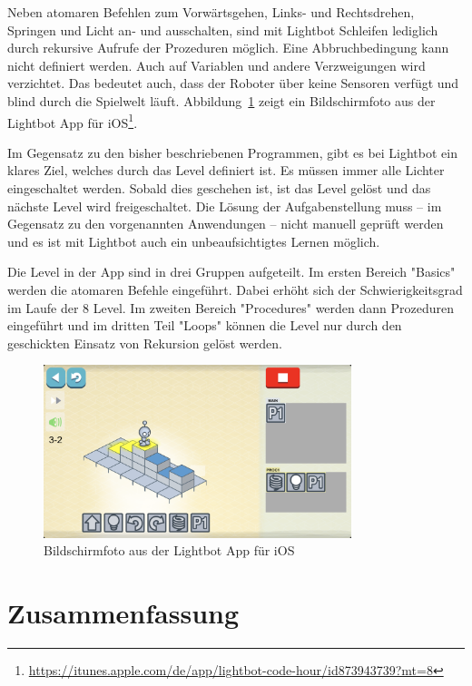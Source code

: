 Neben atomaren Befehlen zum Vorwärtsgehen, Links- und Rechtsdrehen, Springen und Licht an- und ausschalten, sind mit Lightbot Schleifen lediglich durch rekursive Aufrufe der Prozeduren möglich. Eine Abbruchbedingung kann nicht definiert werden. Auch auf Variablen und andere Verzweigungen wird verzichtet. Das bedeutet auch, dass der Roboter über keine Sensoren verfügt und blind durch die Spielwelt läuft. Abbildung~\ref{fig:related:lightbot:screenshot} zeigt ein Bildschirmfoto aus der Lightbot App für iOS\footnote{\url{https://itunes.apple.com/de/app/lightbot-code-hour/id873943739?mt=8}}.

Im Gegensatz zu den bisher beschriebenen Programmen, gibt es bei Lightbot ein klares Ziel, welches durch das Level definiert ist. Es müssen immer alle Lichter eingeschaltet werden. Sobald dies geschehen ist, ist das Level gelöst und das nächste Level wird freigeschaltet. Die Lösung der Aufgabenstellung muss -- im Gegensatz zu den vorgenannten Anwendungen -- nicht manuell geprüft werden und es ist mit Lightbot auch ein unbeaufsichtigtes Lernen möglich.

Die Level in der App sind in drei Gruppen aufgeteilt. Im ersten Bereich "Basics" werden die atomaren Befehle eingeführt. Dabei erhöht sich der Schwierigkeitsgrad im Laufe der 8 Level. Im zweiten Bereich "Procedures" werden dann Prozeduren eingeführt und im dritten Teil "Loops" können die Level nur durch den geschickten Einsatz von Rekursion gelöst werden.

\begin{figure}
    \centering
    \includegraphics[width=0.8\textwidth]{gfx/related-lightbot-screenshot.png}
    \caption{Bildschirmfoto aus der Lightbot App für iOS}
    \label{fig:related:lightbot:screenshot}
\end{figure}

\section{Zusammenfassung}
\label{sec:related:summary}


